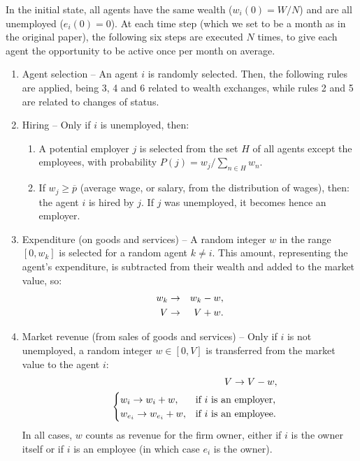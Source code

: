 In the initial state, all agents have the same wealth ($w_i(0)={W}/N$) and are all unemployed ($e_i(0)=0$).
At each time step (which we set to be a month as in the original paper), the following six steps are executed $N$ times, to give each agent the opportunity to be active once per month on average. 


\begin{enumerate}
%
\item  Agent selection --  
An agent $i$ is randomly selected. 
Then, the following rules are applied, being 3, 4 and 6 related to wealth exchanges, while rules 2 and 5 are related to changes of status.  
%
\item { Hiring} -- Only if $i$ is unemployed, then:
\begin{enumerate}[leftmargin=*]
 \item A potential employer $j$ is selected from the set $H$  of all agents except the employees, with probability  $P (j)= w_{j}/\sum_{n\in H}w_{n}$. 
 
\item   If $ w_j \ge \overline{p}$ (average wage, or salary, from the distribution of wages), then: 
the agent $i$ is hired by $j$.   
If $j$ was unemployed, it becomes hence an employer.

\end{enumerate}
% 
%
\item  
{  Expenditure} (on goods and services) --
A random integer $w$ in the range  $\left[0,w_{k}\right]$  is selected for a random agent  $k\neq i$. This amount, representing the agent's expenditure, is subtracted from their wealth and added to the market value, so:
\begin{eqnarray} \notag
w_k  &\to& w_k-w, \\ \notag 
V &\to& V+w.
\end{eqnarray}
 
 
\item 
{ Market revenue} (from sales of goods and services) -- Only if $i$  is not unemployed, a random integer $w \in [0, V]$ is  transferred from the market value to the agent $i$:   
%
\begin{eqnarray}   \notag
   && V \to V - w, \\  \notag
%   
&& \begin{cases} 
  w_i \to w_i + w,         &\mbox{if  $i$ is an employer,}\\
  w_{e_i} \to w_{e_i} + w, &\mbox{if  $i$ is an employee.} 
\end{cases}
\end{eqnarray}
%
 In all cases,  $w$ counts as revenue for the firm owner, either if $i$ is the owner itself or if $i$ is an employee (in which case $e_i$ is the owner). 



\end{enumerate}

